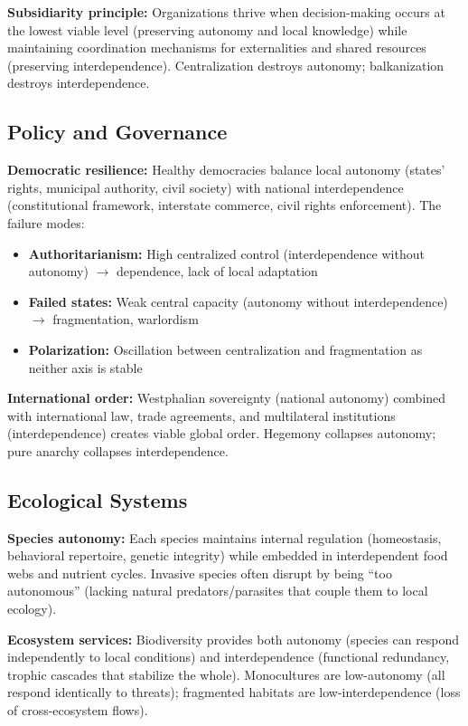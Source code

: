 \documentclass[11pt,a4paper]{article}
\begin{document}
\textbf{Subsidiarity principle:} Organizations thrive when decision-making occurs at the lowest viable level (preserving autonomy and local knowledge) while maintaining coordination mechanisms for externalities and shared resources (preserving interdependence). Centralization destroys autonomy; balkanization destroys interdependence.

\subsection{Policy and Governance}

\textbf{Democratic resilience:} Healthy democracies balance local autonomy (states' rights, municipal authority, civil society) with national interdependence (constitutional framework, interstate commerce, civil rights enforcement). The failure modes:
\begin{itemize}
    \item \textbf{Authoritarianism:} High centralized control (interdependence without autonomy) $\to$ dependence, lack of local adaptation
    \item \textbf{Failed states:} Weak central capacity (autonomy without interdependence) $\to$ fragmentation, warlordism
    \item \textbf{Polarization:} Oscillation between centralization and fragmentation as neither axis is stable
\end{itemize}

\textbf{International order:} Westphalian sovereignty (national autonomy) combined with international law, trade agreements, and multilateral institutions (interdependence) creates viable global order. Hegemony collapses autonomy; pure anarchy collapses interdependence.

\subsection{Ecological Systems}

\textbf{Species autonomy:} Each species maintains internal regulation (homeostasis, behavioral repertoire, genetic integrity) while embedded in interdependent food webs and nutrient cycles. Invasive species often disrupt by being ``too autonomous'' (lacking natural predators/parasites that couple them to local ecology).

\textbf{Ecosystem services:} Biodiversity provides both autonomy (species can respond independently to local conditions) and interdependence (functional redundancy, trophic cascades that stabilize the whole). Monocultures are low-autonomy (all respond identically to threats); fragmented habitats are low-interdependence (loss of cross-ecosystem flows).
\end{document}
